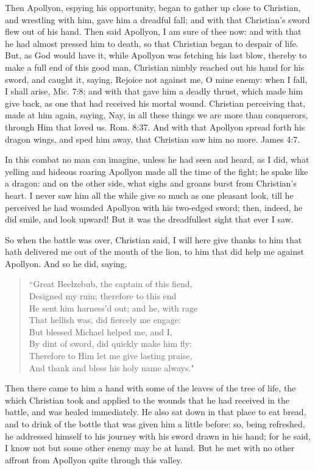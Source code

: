 Then Apollyon, espying his opportunity, began to gather up close to Christian, and wrestling with him, gave him a dreadful fall; and with that Christian's sword flew out of his hand. Then said Apollyon, I am sure of thee now: and with that he had almost pressed him to death, so that Christian began to despair of life. But, as God would have it, while Apollyon was fetching his last blow, thereby to make a full end of this good man, Christian nimbly reached out his hand for his sword, and caught it, saying, Rejoice not against me, O mine enemy: when I fall, I shall arise, Mic. 7:8; and with that gave him a deadly thrust, which made him give back, as one that had received his mortal wound. Christian perceiving that, made at him again, saying, Nay, in all these things we are more than conquerors, through Him that loved us. Rom. 8:37. And with that Apollyon spread forth his dragon wings, and sped him away, that Christian saw him no more. James 4:7.

In this combat no man can imagine, unless he had seen and heard, as I did, what yelling and hideous roaring Apollyon made all the time of the fight; he spake like a dragon: and on the other side, what sighs and groans burst from Christian's heart. I never saw him all the while give so much as one pleasant look, till he perceived he had wounded Apollyon with his two-edged sword; then, indeed, he did smile, and look upward! But it was the dreadfullest sight that ever I saw.

So when the battle was over, Christian said, I will here give thanks to him that hath delivered me out of the mouth of the lion, to him that did help me against Apollyon. And so he did, saying,
\begin{verse} 
``Great Beelzebub, the captain of this fiend,\\
Designed my ruin; therefore to this end\\
He sent him harness'd out; and he, with rage\\
That hellish was, did fiercely me engage:\\
But blessed Michael helped me, and I,\\
By dint of sword, did quickly make him fly:\\
Therefore to Him let me give lasting praise,\\
And thank and bless his holy name always." \\
\end{verse} 
Then there came to him a hand with some of the leaves of the tree of life, the which Christian took and applied to the wounds that he had received in the battle, and was healed immediately. He also sat down in that place to eat bread, and to drink of the bottle that was given him a little before: so, being refreshed, he addressed himself to his journey with his sword drawn in his hand; for he said, I know not but some other enemy may be at hand. But he met with no other affront from Apollyon quite through this valley.

